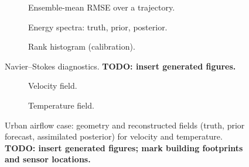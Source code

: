 \begin{figure}[ht]
    \centering
    \begin{subfigure}{0.32\linewidth}\centering
        \caption{Ensemble-mean RMSE over a trajectory.}\label{fig:ns_rmse}
    \end{subfigure}\hfill
    \begin{subfigure}{0.32\linewidth}\centering
        \caption{Energy spectra: truth, prior, posterior.}\label{fig:ns_spectrum}
    \end{subfigure}\hfill
    \begin{subfigure}{0.32\linewidth}\centering
        \caption{Rank histogram (calibration).}\label{fig:ns_rank}
    \end{subfigure}
    \caption{Navier--Stokes diagnostics. \textbf{TODO: insert generated figures.}}
    \label{fig:ns_diagnostics}
\end{figure}

\begin{figure}[ht]
    \centering
    \begin{subfigure}{0.48\linewidth}\centering
        \caption{Velocity field.}\label{fig:urban_vel}
    \end{subfigure}\hfill
    \begin{subfigure}{0.48\linewidth}\centering
        \caption{Temperature field.}\label{fig:urban_temp}
    \end{subfigure}
    \caption{Urban airflow case: geometry and reconstructed fields (truth, prior forecast, assimilated posterior) for velocity and temperature. \textbf{TODO: insert generated figures; mark building footprints and sensor locations.}}
    \label{fig:urban_fields}
\end{figure}

